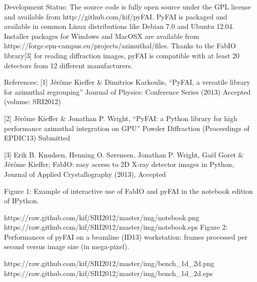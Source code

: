 Development Status: The source code is fully open source under the GPL license and available from http://github.com/kif/pyFAI. 
PyFAI is packaged and available in common Linux distributions like Debian 7.0 and Ubuntu 12.04. 
Installer packages for Windows and MacOSX are available from https://forge.epn-campus.eu/projects/azimuthal/files. 
Thanks to the FabIO library[3] for reading diffraction images, pyFAI is compatible with at least 20 detectors from 12 different manufacturers. 

References:
[1] Jérôme Kieffer & Dimitrios Karkoulis,
	“PyFAI, a versatile library for azimuthal regrouping”
	Journal of Physics: Conference Series (2013)
	Accepted (volume: SRI2012)

[2] 	Jérôme Kieffer & Jonathan P. Wright,
	“PyFAI: a Python library for high performance azimuthal integration on GPU”
	Powder Diffraction (Proceedings of EPDIC13)
	Submitted

[3] Erik B. Knudsen, Henning O. Sørensen,  Jonathan P. Wright, Gaël Goret & Jérôme Kieffer;
	FabIO: easy access to 2D X-ray detector images in Python,
    	Journal of Applied Crystallography (2013),
    	Accepted


Figure 1: Example of interactive use of FabIO and pyFAI in the notebook edition
of IPython.

https://raw.github.com/kif/SRI2012/master/img/notebook.png
https://raw.github.com/kif/SRI2012/master/img/notebook.eps
Figure 2: Performances of pyFAI on a beamline (ID13) workstation: frames processed per second versus image size (in mega-pixel).

https://raw.github.com/kif/SRI2012/master/img/bench_1d_2d.png
https://raw.github.com/kif/SRI2012/master/img/bench_1d_2d.eps
